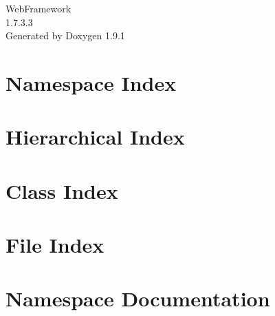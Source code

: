 \let\mypdfximage\pdfximage\def\pdfximage{\immediate\mypdfximage}\documentclass[twoside]{book}
\newcommand{\+}{\discretionary{\mbox{\scriptsize$\hookleftarrow$}}{}{}}
\newcommand{\clearemptydoublepage}{%
  \newpage{\pagestyle{empty}\cleardoublepage}%
}
\begin{document}
\raggedbottom

\hypersetup{pageanchor=false,
             bookmarksnumbered=true,
             pdfencoding=unicode
            }
\begin{titlepage}
\vspace*{7cm}
\begin{center}%
{\Large Web\+Framework \\[1ex]\large 1.\+7.\+3.\+3 }\\
\vspace*{1cm}
{\large Generated by Doxygen 1.9.1}\\
\end{center}
\end{titlepage}
\clearemptydoublepage
{}
\tableofcontents
\clearemptydoublepage
{}
\hypersetup{pageanchor=true}

\chapter{Namespace Index}

\chapter{Hierarchical Index}

\chapter{Class Index}

\chapter{File Index}

\chapter{Namespace Documentation}












\end{document}
